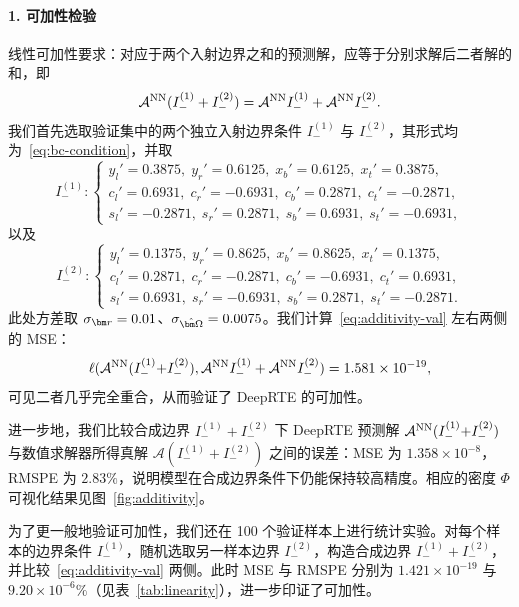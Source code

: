 \paragraph{1. 可加性检验}
线性可加性要求：对应于两个入射边界之和的预测解，应等于分别求解后二者解的和，即
\begin{equation}\label{eq:additivity-val}
    \mathcal{A}^{\text{NN}}(I_{-}^{(1)} + I_{-}^{(2)}) = \mathcal{A}^{\text{NN}} I_{-}^{(1)} + \mathcal{A}^{\text{NN}} I_{-}^{(2)}.
\end{equation}
我们首先选取验证集中的两个独立入射边界条件 $I_{-}^{(1)}$ 与 $I_{-}^{(2)}$，其形式均为~\eqref{eq:bc-condition}，并取
\begin{equation}
    I_{-}^{(1)}:
    \begin{cases}
        y_l'=0.3875,\; y_r'=0.6125,\; x_b'=0.6125,\; x_t'=0.3875,   \\
        c_l'=0.6931,\; c_r'=-0.6931,\; c_b'=0.2871,\; c_t'=-0.2871, \\
        s_l'=-0.2871,\; s_r'=0.2871,\; s_b'=0.6931,\; s_t'=-0.6931,
    \end{cases}
\end{equation}
以及
\begin{equation}
    I_{-}^{(2)}:
    \begin{cases}
        y_l'=0.1375,\; y_r'=0.8625,\; x_b'=0.8625,\; x_t'=0.1375,   \\
        c_l'=0.2871,\; c_r'=-0.2871,\; c_b'=-0.6931,\; c_t'=0.6931, \\
        s_l'=0.6931,\; s_r'=-0.6931,\; s_b'=0.2871,\; s_t'=-0.2871.
    \end{cases}
\end{equation}
此处方差取 $\sigma_{\br}=0.01$、$\sigma_{\bOmega}=0.0075$。我们计算~\eqref{eq:additivity-val} 左右两侧的 MSE：
\begin{equation}
    \ell(\mathcal{A}^{\text{NN}} (I_{-}^{(1)}{+}I_{-}^{(2)}),\mathcal{A}^{\text{NN}} I_{-}^{(1)} + \mathcal{A}^{\text{NN}} I_{-}^{(2)})=1.581\times 10^{-19},
\end{equation}
可见二者几乎完全重合，从而验证了 DeepRTE 的可加性。

进一步地，我们比较合成边界 $I_{-}^{(1)}{+}I_{-}^{(2)}$ 下 DeepRTE 预测解 $\mathcal{A}^{\text{NN}} (I_{-}^{(1)}{+}I_{-}^{(2)})$ 与数值求解器所得真解 $\mathcal{A}(I_{-}^{(1)}{+}I_{-}^{(2)})$ 之间的误差：MSE 为 $1.358\times10^{-8}$，RMSPE 为 $2.83\%$，说明模型在合成边界条件下仍能保持较高精度。相应的密度 $\Phi$ 可视化结果见图~\ref{fig:additivity}。

为了更一般地验证可加性，我们还在 100 个验证样本上进行统计实验。对每个样本的边界条件 $I_{-}^{(1)}$，随机选取另一样本边界 $I_{-}^{(2)}$，构造合成边界 $I_{-}^{(1)}{+}I_{-}^{(2)}$，并比较~\eqref{eq:additivity-val} 两侧。此时 MSE 与 RMSPE 分别为 $1.421\times 10^{-19}$ 与 $9.20\times10^{-6}\%$（见表~\ref{tab:linearity}），进一步印证了可加性。

